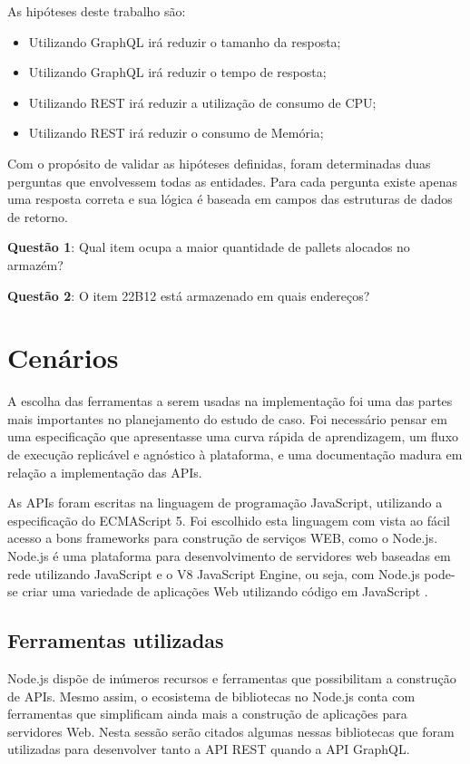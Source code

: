 As hipóteses deste trabalho são: 

\begin{itemize}
\item Utilizando GraphQL irá reduzir o tamanho da resposta;
\item Utilizando GraphQL irá reduzir o tempo de resposta;
\item Utilizando REST irá reduzir a utilização de consumo de CPU;
\item Utilizando REST irá reduzir o consumo de Memória;
\end{itemize}

Com o propósito de validar as hipóteses definidas, foram determinadas duas perguntas que envolvessem todas as entidades. Para cada pergunta existe apenas uma resposta correta e sua lógica é baseada em campos das estruturas de dados de retorno.

\textbf{Questão 1}: Qual item ocupa a maior quantidade de pallets alocados no armazém?

\textbf{Questão 2}: O item 22B12 está armazenado em quais endereços?

\section{Cenários} \label{sec:cenarios}

A escolha das ferramentas a serem usadas na implementação foi uma das partes mais importantes no planejamento do estudo de caso. Foi necessário pensar em uma especificação que apresentasse uma curva rápida de aprendizagem, um fluxo de execução replicável e agnóstico à plataforma, e uma documentação madura em relação a implementação das APIs.

As APIs foram escritas na linguagem de programação JavaScript, utilizando a especificação do ECMAScript 5. Foi escolhido esta linguagem com vista ao fácil acesso a bons frameworks para construção de serviços WEB, como o Node.js. Node.js é uma plataforma para desenvolvimento de servidores web baseadas em rede utilizando JavaScript e o V8 JavaScript Engine, ou seja, com Node.js pode-se criar uma variedade de aplicações Web utilizando código em JavaScript .

\subsection{Ferramentas utilizadas}

Node.js dispõe de inúmeros recursos e ferramentas que possibilitam a construção de APIs. Mesmo assim, o ecosistema de bibliotecas no Node.js conta com ferramentas que simplificam ainda mais a construção de aplicações para servidores Web. Nesta sessão serão citados algumas nessas bibliotecas que foram utilizadas para desenvolver tanto a API REST quando a API GraphQL. 

